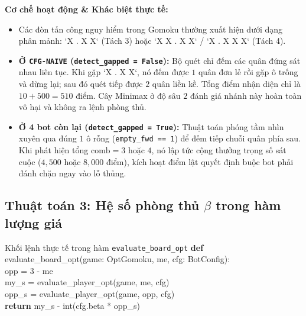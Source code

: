 \documentclass[11pt,a4paper]{article}
\begin{document}
\textbf{Cơ chế hoạt động \& Khác biệt thực tế:}
\begin{itemize}
    \item Các đòn tấn công nguy hiểm trong Gomoku thường xuất hiện dưới dạng phân mảnh: `X . X X` (Tách 3) hoặc `X X . X X` / `X . X X X` (Tách 4).
    \item \textbf{Ở \texttt{CFG-NAIVE} (\texttt{detect\_gapped = False}):} Bộ quét chỉ đếm các quân đứng sát nhau liên tục. Khi gặp `X . X X`, nó đếm được $1$ quân đơn lẻ rồi gặp ô trống và dừng lại; sau đó quét tiếp được $2$ quân liền kề. Tổng điểm nhận diện chỉ là $10 + 500 = 510$ điểm. Cây Minimax ở độ sâu $2$ đánh giá nhánh này hoàn toàn vô hại và không ra lệnh phòng thủ.
    \item \textbf{Ở 4 bot còn lại (\texttt{detect\_gapped = True}):} Thuật toán phóng tầm nhìn xuyên qua đúng $1$ ô rỗng (\texttt{empty\_fwd == 1}) để đếm tiếp chuỗi quân phía sau. Khi phát hiện tổng $\text{comb} = 3$ hoặc $4$, nó lập tức cộng thưởng trọng số sát cuộc ($4{,}500$ hoặc $8{,}000$ điểm), kích hoạt điểm lật quyết định buộc bot phải đánh chặn ngay vào lỗ thủng.
\end{itemize}

\subsection{Thuật toán 3: Hệ số phòng thủ \texorpdfstring{$\beta$}{Beta} trong hàm lượng giá}
\begin{codebox}{Khối lệnh thực tế trong hàm \texttt{evaluate\_board\_opt}}
\small\ttfamily
\textbf{def} evaluate\_board\_opt(game: OptGomoku, me, cfg: BotConfig):\\
\quad opp = 3 - me\\
\quad my\_s = evaluate\_player\_opt(game, me, cfg)\\
\quad opp\_s = evaluate\_player\_opt(game, opp, cfg)\\
\quad \textbf{return} my\_s - int(cfg.beta * opp\_s)
\end{codebox}
\end{document}
